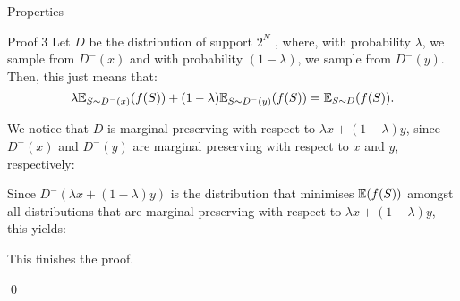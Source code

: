 \documentclass[a4paper]{article}
\begin{document}
\begin{parag}{Properties}
\begin{subparag}{Proof 3}
        Let $D$ be the distribution of support $2^N$ , where, with probability $\lambda$, we sample from $D^-\left(x\right)$ and with probability $\left(1 - \lambda\right)$, we sample from $D^-\left(y\right)$. Then, this just means that: 
        \[\lambda \exval_{S \followsdistr D^-\left(x\right)} \left(f\left(S\right)\right) + \left(1 - \lambda\right) \exval_{S \followsdistr D^-\left(y\right)} \left(f\left(S\right)\right) = \exval_{S \followsdistr D}\left(f\left(S\right)\right).\]
        
        We notice that $D$ is marginal preserving with respect to $\lambda x + \left(1 - \lambda\right)y$, since $D^-\left(x\right)$ and $D^-\left(y\right)$ are marginal preserving with respect to $x$ and $y$, respectively:

        Since $D^-\left(\lambda x + \left(1 - \lambda\right)y\right)$ is the distribution that minimises $\exval\left(f\left(S\right)\right)$ amongst all distributions that are marginal preserving with respect to $\lambda x + \left(1 - \lambda\right)y$, this yields: 
        
        This finishes the proof.

        \qed
    \end{subparag}
\end{parag}
\end{document}
